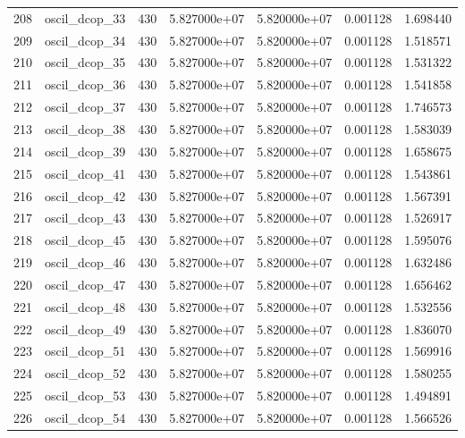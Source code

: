 \begin{tabular}{llrrrrr}
208 &            oscil\_dcop\_33 &   430 &  5.827000e+07 &  5.820000e+07 &  0.001128 &   1.698440 \\
209 &            oscil\_dcop\_34 &   430 &  5.827000e+07 &  5.820000e+07 &  0.001128 &   1.518571 \\
210 &            oscil\_dcop\_35 &   430 &  5.827000e+07 &  5.820000e+07 &  0.001128 &   1.531322 \\
211 &            oscil\_dcop\_36 &   430 &  5.827000e+07 &  5.820000e+07 &  0.001128 &   1.541858 \\
212 &            oscil\_dcop\_37 &   430 &  5.827000e+07 &  5.820000e+07 &  0.001128 &   1.746573 \\
213 &            oscil\_dcop\_38 &   430 &  5.827000e+07 &  5.820000e+07 &  0.001128 &   1.583039 \\
214 &            oscil\_dcop\_39 &   430 &  5.827000e+07 &  5.820000e+07 &  0.001128 &   1.658675 \\
215 &            oscil\_dcop\_41 &   430 &  5.827000e+07 &  5.820000e+07 &  0.001128 &   1.543861 \\
216 &            oscil\_dcop\_42 &   430 &  5.827000e+07 &  5.820000e+07 &  0.001128 &   1.567391 \\
217 &            oscil\_dcop\_43 &   430 &  5.827000e+07 &  5.820000e+07 &  0.001128 &   1.526917 \\
218 &            oscil\_dcop\_45 &   430 &  5.827000e+07 &  5.820000e+07 &  0.001128 &   1.595076 \\
219 &            oscil\_dcop\_46 &   430 &  5.827000e+07 &  5.820000e+07 &  0.001128 &   1.632486 \\
220 &            oscil\_dcop\_47 &   430 &  5.827000e+07 &  5.820000e+07 &  0.001128 &   1.656462 \\
221 &            oscil\_dcop\_48 &   430 &  5.827000e+07 &  5.820000e+07 &  0.001128 &   1.532556 \\
222 &            oscil\_dcop\_49 &   430 &  5.827000e+07 &  5.820000e+07 &  0.001128 &   1.836070 \\
223 &            oscil\_dcop\_51 &   430 &  5.827000e+07 &  5.820000e+07 &  0.001128 &   1.569916 \\
224 &            oscil\_dcop\_52 &   430 &  5.827000e+07 &  5.820000e+07 &  0.001128 &   1.580255 \\
225 &            oscil\_dcop\_53 &   430 &  5.827000e+07 &  5.820000e+07 &  0.001128 &   1.494891 \\
226 &            oscil\_dcop\_54 &   430 &  5.827000e+07 &  5.820000e+07 &  0.001128 &   1.566526 \\

\end{tabular}

